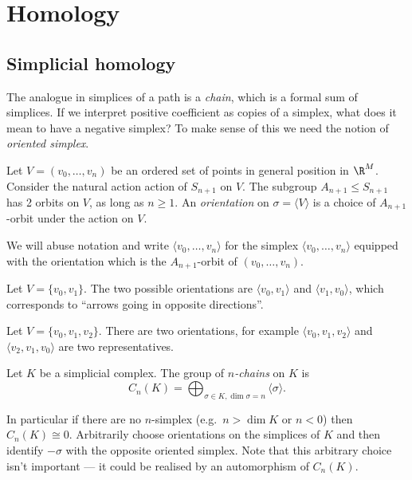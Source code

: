 \documentclass[a4paper]{article}
\begin{document}
\section{Homology}

\subsection{Simplicial homology}

The analogue in simplices of a path is a \emph{chain}, which is a formal sum of simplices. If we interpret positive coefficient as copies of a simplex, what does it mean to have a negative simplex? To make sense of this we need the notion of \emph{oriented simplex}.

\begin{definition}[orientation]
  Let \(V = (v_0, \dots, v_n)\) be an ordered set of points in general position in \(\R^M\). Consider the natural action action of \(S_{n + 1}\) on \(V\). The subgroup \(A_{n + 1} \leq S_{n + 1}\) has 2 orbits on \(V\), as long as \(n \geq 1\). An \emph{orientation} on \(\sigma = \langle V \rangle\) is a choice of \(A_{n + 1}\)-orbit under the action on \(V\).

  We will abuse notation and write \(\langle v_0, \dots, v_n \rangle\) for the simplex \(\langle v_0, \dots, v_n \rangle\) equipped with the orientation which is the \(A_{n + 1}\)-orbit of \((v_0, \dots, v_n)\).
\end{definition}

\begin{eg}
  Let \(V = \{v_0, v_1\}\). The two possible orientations are \(\langle v_0, v_1 \rangle\) and \(\langle v_1, v_0\rangle\), which corresponds to ``arrows going in opposite directions''.
\end{eg}

\begin{eg}
  Let \(V = \{v_0, v_1, v_2\}\). There are two orientations, for example \(\langle v_0, v_1, v_2 \rangle\) and \(\langle v_2, v_1, v_0 \rangle\) are two representatives.
\end{eg}

\begin{definition}[chain]
  Let \(K\) be a simplicial complex. The group of \emph{\(n\)-chains} on \(K\) is
  \[
    C_n(K) = \bigoplus_{\sigma \in K, \dim \sigma = n} \langle \sigma \rangle.
  \]
\end{definition}

In particular if there are no \(n\)-simplex (e.g.\ \(n > \dim K\) or \(n < 0\)) then \(C_n(K) \cong 0\). Arbitrarily choose orientations on the simplices of \(K\) and then identify \(-\sigma\) with the opposite oriented simplex. Note that this arbitrary choice isn't important --- it could be realised by an automorphism of \(C_n(K)\).
\end{document}
